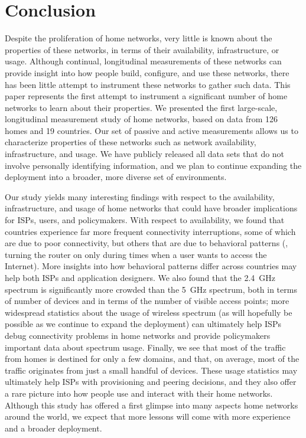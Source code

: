 \section{Conclusion}\label{sec:conclusion}

Despite the proliferation of home networks, very little is known about
the properties of these networks, in terms of their availability,
infrastructure, or usage.  Although continual, longitudinal measurements
of these networks can provide insight into how people build, configure,
and use these networks, there has been little attempt to instrument
these networks to gather such data.  This paper represents the first
attempt to instrument a significant number of home networks to learn
about their properties. We presented the first large-scale, longitudinal
measurement study of home networks, based on data from 126 homes and 19
countries.  Our set of passive and active measurements allows us to
characterize properties of these networks such as network availability,
infrastructure, and usage.  We have publicly released all data sets that
do not involve personally identifying information, and we plan to
continue expanding the deployment into a broader, more diverse set of
environments.

Our study yields many interesting findings with respect to the
availability, infrastructure, and usage of home networks that could have
broader implications for ISPs, users, and policymakers.  With respect to
availability, we found that \developing{} countries experience far more frequent
connectivity interruptions, some of which are due to poor connectivity,
but others that are due to behavioral patterns (\eg, turning the router
on only during times when a user wants to access the Internet).  More
insights into how behavioral patterns differ across countries may help
both ISPs and application designers.  We also found that the 2.4~GHz
spectrum is significantly more crowded than the 5~GHz spectrum, both in
terms of number of devices and in terms of the number of visible access
points; more widespread statistics about the usage of wireless spectrum
(as will hopefully be possible as we continue to expand the \name{}
deployment) can ultimately help ISPs debug connectivity problems in home
networks and provide policymakers important data about spectrum usage.
Finally, we see that most of the traffic from homes is destined for only
a few domains, and that, on average, most of the traffic originates from
just a small handful of devices.  These usage statistics may ultimately
help ISPs with provisioning and peering decisions, and they also offer a
rare picture into how people use and interact with their home networks.
Although this study has offered a first glimpse into many aspects home
networks around the world, we expect that more lessons will come with
more experience and a broader deployment.


